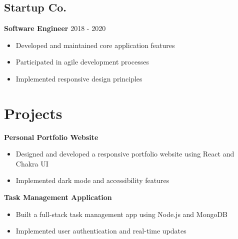 \documentclass[11pt,a4paper]{article}
\begin{document}
\subsection*{Startup Co.}
\textbf{\textcolor{accent}{Software Engineer}} \hfill \textcolor{subtext}{2018 - 2020}
\begin{itemize}[leftmargin=*]
    \item Developed and maintained core application features
    \item Participated in agile development processes
    \item Implemented responsive design principles
\end{itemize}

\section{Projects}
\textbf{\textcolor{accent}{Personal Portfolio Website}}
\begin{itemize}[leftmargin=*]
    \item Designed and developed a responsive portfolio website using React and Chakra UI
    \item Implemented dark mode and accessibility features
\end{itemize}

\textbf{\textcolor{accent}{Task Management Application}}
\begin{itemize}[leftmargin=*]
    \item Built a full-stack task management app using Node.js and MongoDB
    \item Implemented user authentication and real-time updates
\end{itemize}
\end{document}
